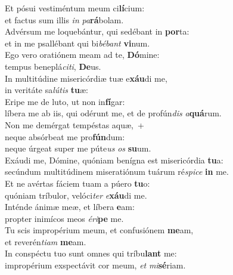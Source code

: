 \evenverse Et pósui vestiméntum meum ci\textbf{lí}cium:~\*\\
\evenverse et factus sum illis \textit{in} \textit{pa}\textbf{rá}bolam.\\
\oddverse Advérsum me loquebántur, qui sedébant in \textbf{por}ta:~\*\\
\oddverse et in me psallébant qui bi\textit{bé}\textit{bant} \textbf{vi}num.\\
\evenverse Ego vero oratiónem meam ad te, \textbf{Dó}mine:~\*\\
\evenverse tempus beneplá\textit{ci}\textit{ti}, \textbf{De}us.\\
\oddverse In multitúdine misericórdiæ tuæ e\textbf{xáu}di me,~\*\\
\oddverse in veritáte sa\textit{lú}\textit{tis} \textbf{tu}æ:\\
\evenverse Eripe me de luto, ut non in\textbf{fí}gar:~\*\\
\evenverse líbera me ab iis, qui odérunt me, et de profún\textit{dis} \textit{a}\textbf{quá}rum.\\
\oddverse Non me demérgat tempéstas aquæ,~+\\
\oddverse  neque absórbeat me pro\textbf{fún}dum:~\*\\
\oddverse neque úrgeat super me púte\textit{us} \textit{os} \textbf{su}um.\\
\evenverse Exáudi me, Dómine, quóniam benígna est misericórdia \textbf{tu}a:~\*\\
\evenverse secúndum multitúdinem miseratiónum tuárum ré\textit{spi}\textit{ce} \textbf{in} me.\\
\oddverse Et ne avértas fáciem tuam a púero \textbf{tu}o:~\*\\
\oddverse quóniam tríbulor, velóci\textit{ter} \textit{e}\textbf{xáu}di me.\\
\evenverse Inténde ánimæ meæ, et líbera \textbf{e}am:~\*\\
\evenverse propter inimícos meos \textit{é}\textit{ri}\textbf{pe} me.\\
\oddverse Tu scis impropérium meum, et confusiónem \textbf{me}am,~\*\\
\oddverse et reverén\textit{ti}\textit{am} \textbf{me}am.\\
\evenverse In conspéctu tuo sunt omnes qui tríbu\textbf{lant} me:~\*\\
\evenverse impropérium exspectávit cor meum, \textit{et} \textit{mi}\textbf{sé}riam.\\
